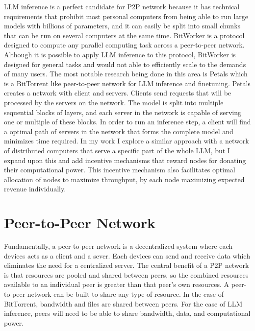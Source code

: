 \documentclass[preprint,twoside,11pt]{article}
\begin{document}
LLM inference is a perfect candidate for P2P network because it has technical requirements that prohibit most personal computers from being able to run
large models with billions of parameters, and it can easily be split into small chunks that can be run on several computers at the same time. BitWorker \citep{Durand_Gasparyan_Rouvinez_Aad_Braun_Trinh_2015} is a protocol designed to compute any parallel computing task across a peer-to-peer network.
Although it is possible to apply LLM inference to this protocol, BitWorker is designed for general tasks and would not able to efficiently scale to the demands of many users.
The most notable research being done in this area is Petals \citep{borzunov2023petalscollaborativeinferencefinetuning} which is a BitTorrent like peer-to-peer network for LLM inference and finetuning.
Petals creates a network with client and servers. Clients send requests that will be processed by the servers on the network. The model is split into multiple sequential blocks of layers, and each server
in the network is capable of serving one or multiple of these blocks. In order to run an inference step, a client will find a optimal path of servers
in the network that forms the complete model and minimizes time required. In my work I explore a similar approach with a network of distributed computers that serve a specific part of the whole LLM,
but I expand upon this and add incentive mechanisms that reward nodes for donating their computational power. This incentive mechanism also facilitates optimal allocation of nodes to maximize throughput, by each
node maximizing expected revenue individually.

\section{Peer-to-Peer Network}

Fundamentally, a peer-to-peer network is a decentralized system where each devices acts as a client and a sever.
Each devices can send and receive data which eliminates the need for a centralized server. The central benefit of a P2P network
is that resources are pooled and shared between peers, so the combined resources available to an individual peer is greater than that peer's own resources.
A peer-to-peer network can be built to share any type of resource. In the case of BitTorrent, bandwidth and files are shared between peers.
For the case of LLM inference, peers will need to be able to share bandwidth, data, and computational power.
\end{document}
